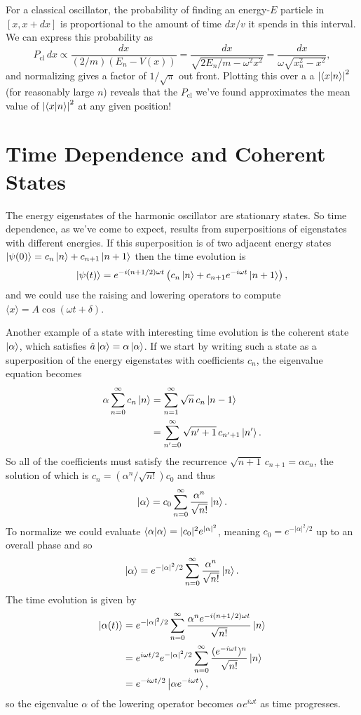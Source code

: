\documentclass[../p116main.tex]{subfiles}
\begin{document}
For a classical oscillator, the probability of finding an energy-$E$ particle in $[x, x + dx]$ is proportional to the amount of time $dx / v$ it spends in this interval.
We can express this probability as
\[ P_\textrm{cl} \, dx \propto \frac{dx}{(2 / m)(E_n - V(x))} = \frac{dx}{\sqrt{2 E_n / m - \omega^2 x^2}} = \frac{dx}{\omega \sqrt{x_n^2 - x^2}}, \]
and normalizing gives a factor of $1 / \sqrt{\pi}$ out front.
Plotting this over a a $\left| \left< x \middle| n \right> \right|^2$ (for reasonably large $n$) reveals that the $P_\text{cl}$ we've found approximates the mean value of $\left| \left< x \middle| n \right> \right|^2$ at any given position!

\section{Time Dependence and Coherent States}
The energy eigenstates of the harmonic oscillator are stationary states.
So time dependence, as we've come to expect, results from superpositions of eigenstates with different energies.
If this superposition is of two adjacent energy states $\left| \psi(0) \right> = c_n \left| n \right> + c_{n+1} \left| n+1 \right>$ then the time evolution is
\[ \left| \psi(t) \right> = e^{-i(n + 1 / 2) \omega t} \left( c_n \left| n \right> + c_{n+1} e^{-i\omega t} \left| n+1 \right> \right), \]
and we could use the raising and lowering operators to compute $\langle x \rangle = A \cos(\omega t + \delta)$.

Another example of a state with interesting time evolution is the coherent state $\left| \alpha \right>$, which satisfies $\hat a \left| \alpha \right> = \alpha \left| \alpha \right>$.
If we start by writing such a state as a superposition of the energy eigenstates with coefficients $c_n$, the eigenvalue equation becomes   \vspace{-6pt}
\begin{align*}
    \alpha \sum_{n=0}^{\infty} c_n \left| n \right> &= \sum_{n=1}^{\infty} \sqrt{n} \,c_n \left| n-1 \right> \\
    &= \sum_{n'=0}^{\infty} \sqrt{n'+1} \,c_{n'+1} \left| n' \right>.
\end{align*}
So all of the coefficients must satisfy the recurrence $\sqrt{n+1} \, c_{n+1} = \alpha c_n$, the solution of which is $c_n = (\alpha^n / \sqrt{n!}) c_0$ and thus
\[ \left| \alpha \right> = c_0 \sum_{n=0}^{\infty} \frac{\alpha^n}{\sqrt{n!}} \left| n \right>. \]
To normalize we could evaluate $\left< \alpha \middle| \alpha \right> = |c_0|^2 e^{|\alpha|^2}$, meaning $c_0 = e^{-|\alpha|^2 / 2}$ up to an overall phase and so
\[ \left| \alpha \right> = e^{-|\alpha|^2 / 2} \sum_{n=0}^{\infty} \frac{\alpha^{n}}{\sqrt{n!}} \left| n \right>. \]
The time evolution is given by
\begin{align*}
    \left| \alpha(t) \right> &= e^{-|\alpha|^2 / 2} \sum_{n=0}^{\infty} \frac{\alpha^{n} e^{-i(n + 1 / 2) \omega t}}{\sqrt{n!}} \left| n \right> \\
    &= e^{i \omega t / 2} e^{-|\alpha|^2 / 2} \sum_{n=0}^{\infty} \frac{( e^{-i \omega t})^{n}}{\sqrt{n!}} \left| n \right> \\
    &= e^{-i \omega t / 2} \left| \alpha e^{-i \omega t} \right>,
\end{align*}
so the eigenvalue $\alpha$ of the lowering operator becomes $\alpha e^{i \omega t}$ as time progresses.
\end{document}
